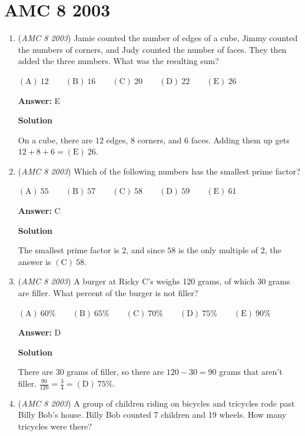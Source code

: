 \section{AMC 8 2003}
        \begin{enumerate}
        	\item (\textit{AMC 8 2003}) Jamie counted the number of edges of a cube, Jimmy counted the numbers of corners, and Judy counted the number of faces. They then added the three numbers. What was the resulting sum?


 $\mathrm{(A)}\ 12 \qquad\mathrm{(B)}\ 16 \qquad\mathrm{(C)}\ 20 \qquad\mathrm{(D)}\ 22 \qquad\mathrm{(E)}\ 26$

 \textbf{Answer: }E



\textbf{Solution}

On a cube, there are $12$ edges, $8$ corners, and $6$ faces. Adding them up gets $12+8+6= \boxed{\mathrm{(E)}\ 26}$.

 


	\item (\textit{AMC 8 2003}) Which of the following numbers has the smallest prime factor?


 $\mathrm{(A)}\ 55 \qquad\mathrm{(B)}\ 57 \qquad\mathrm{(C)}\ 58 \qquad\mathrm{(D)}\ 59 \qquad\mathrm{(E)}\ 61$

 \textbf{Answer: }C



\textbf{Solution}

The smallest prime factor is $2$, and since $58$ is the only multiple of $2$, the answer is $\boxed{\mathrm{(C)}\ 58}$.

 


	\item (\textit{AMC 8 2003}) A burger at Ricky C's weighs 120 grams, of which 30 grams are filler. What percent of the burger is not filler?


 $\mathrm{(A)}\ 60\% \qquad\mathrm{(B)}\ 65\% \qquad\mathrm{(C)}\ 70\% \qquad\mathrm{(D)}\ 75\% \qquad\mathrm{(E)}\ 90\%$

 \textbf{Answer: }D



\textbf{Solution}

There are $30$ grams of filler, so there are $120-30= 90$ grams that aren't filler. $\frac{90}{120}=\frac{3}{4}=\boxed{\mathrm{(D)}\ 75\%}$.

 


	\item (\textit{AMC 8 2003}) A group of children riding on bicycles and tricycles rode past Billy Bob's house. Billy Bob counted 7 children and 19 wheels. How many tricycles were there?



\end{enumerate}
